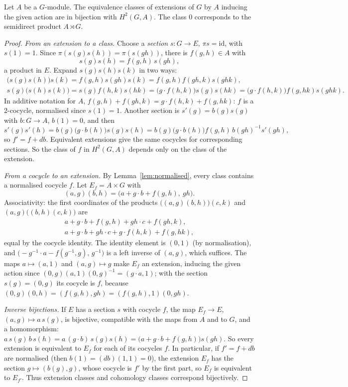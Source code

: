 \begin{theorem}[Schreier]\label{thm:h2ext}
Let $A$ be a $G$-module. The equivalence classes of extensions of $G$ by $A$ inducing the given action are in bijection with $H^2(G,A)$. The class $0$ corresponds to the semidirect product $A\rtimes G$.
\end{theorem}

\begin{proof}
\emph{From an extension to a class.} Choose a \emph{section} $s\colon G\to E$, $\pi s=\mathrm{id}$, with $s(1)=1$. Since $\pi(s(g)s(h))=\pi(s(gh))$, there is $f(g,h)\in A$ with
\[
s(g)s(h)=f(g,h)\,s(gh),
\]
a product in $E$. Expand $s(g)s(h)s(k)$ in two ways:
\[
\begin{gathered}
\bigl(s(g)s(h)\bigr)s(k)=f(g,h)s(gh)s(k)=f(g,h)f(gh,k)s(ghk),\\
s(g)\bigl(s(h)s(k)\bigr)=s(g)f(h,k)s(hk)=\bigl(g\cdot f(h,k)\bigr)s(g)s(hk)=\bigl(g\cdot f(h,k)\bigr)f(g,hk)s(ghk).
\end{gathered}
\]
In additive notation for $A$, $f(g,h)+f(gh,k)=g\cdot f(h,k)+f(g,hk)$: $f$ is a $2$-cocycle, normalised since $s(1)=1$. Another section is $s'(g)=b(g)s(g)$ with $b\colon G\to A$, $b(1)=0$, and then
\[
s'(g)s'(h)=b(g)\bigl(g\cdot b(h)\bigr)s(g)s(h)=b(g)\bigl(g\cdot b(h)\bigr)f(g,h)\,b(gh)^{-1}s'(gh),
\]
so $f'=f+db$. Equivalent extensions give the same cocycles for corresponding sections. So the class of $f$ in $H^2(G,A)$ depends only on the class of the extension.

\emph{From a cocycle to an extension.} By Lemma~\ref{lem:normalised}, every class contains a normalised cocycle $f$. Let $E_f=A\times G$ with
\[
(a,g)(b,h)=\bigl(a+g\cdot b+f(g,h),\ gh\bigr).
\]
Associativity: the first coordinates of the products $\bigl((a,g)(b,h)\bigr)(c,k)$ and
$(a,g)\bigl((b,h)(c,k)\bigr)$ are
\[
\begin{gathered}
a+g\cdot b+f(g,h)+gh\cdot c+f(gh,k),\\
a+g\cdot b+gh\cdot c+g\cdot f(h,k)+f(g,hk),
\end{gathered}
\]
equal by the cocycle identity. The identity element is
$(0,1)$ (by normalisation), and $\bigl(-g^{-1}\cdot a-f(g^{-1},g),\,g^{-1}\bigr)$ is a left inverse of $(a,g)$, which suffices. The maps $a\mapsto(a,1)$ and $(a,g)\mapsto g$ make $E_f$ an extension, inducing the given action since
$(0,g)(a,1)(0,g)^{-1}=(g\cdot a,1)$; with the section $s(g)=(0,g)$ its cocycle is $f$, because $(0,g)(0,h)=(f(g,h),gh)=(f(g,h),1)(0,gh)$.

\emph{Inverse bijections.} If $E$ has a section $s$ with cocycle $f$, the map $E_f\to E$, $(a,g)\mapsto a\,s(g)$, is bijective, compatible with the maps from $A$ and to $G$, and a homomorphism:
$a\,s(g)\,b\,s(h)=a\,(g\cdot b)\,s(g)s(h)=\bigl(a+g\cdot b+f(g,h)\bigr)s(gh)$. So every extension is equivalent to $E_f$ for each of its cocycles $f$. In particular, if $f'=f+db$ are normalised (then $b(1)=(db)(1,1)=0$), the extension $E_f$ has the
section $g\mapsto(b(g),g)$, whose cocycle is $f'$ by the first part, so $E_f$ is equivalent to $E_{f'}$. Thus extension classes and cohomology classes correspond bijectively.


\end{proof}
